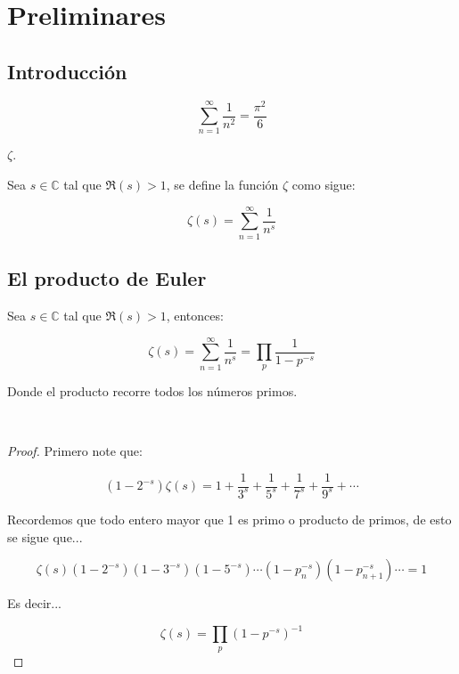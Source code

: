 
\thispagestyle{empty}
\vspace{-0.7cm}


\section{Preliminares}

\lipsum[3]

\subsection{Introducción}
\lipsum[1]

$$\sum_{n=1}^{\infty}\dfrac{1}{n^2}=\dfrac{\pi^2}{6}$$

\lipsum[2]$\zeta$.

\begin{definition}
Sea $s \in \mathbb{C}$ tal que $\Re(s)>1$, se define la función $\zeta$ como sigue:

$$\zeta(s)=\sum_{n=1}^{\infty}\dfrac{1}{n^s}$$
\end{definition}

\begin{note}
  \lipsum[1]
\end{note}


\subsection{El producto de Euler}
\lipsum[2]
\begin{theorem}
    Sea $s\in \mathbb{C}$ tal que $\Re(s)>1$, entonces:

    $$\zeta(s)=\sum_{n=1}^{\infty}\dfrac{1}{n^s}=\prod_p \dfrac{1}{1-p^{-s}}$$

    Donde el producto recorre todos los números primos.
\end{theorem}

\lipsum[3]\\

\begin{proof}
    Primero note que:

    $$(1-2^{-s})\zeta(s)=1+\dfrac{1}{3^s}+\dfrac{1}{5^s}+\dfrac{1}{7^s}+\dfrac{1}{9^s}+\cdots$$

    Recordemos que todo entero mayor que 1 es primo o producto de primos, de esto se sigue que...

    $$\zeta(s)\left(1-2^{-s}\right)(1-3^{-s})(1-5^{-s})\cdots(1-p_n^{-s})(1-p_{n+1}^{-s})\cdots=1$$

    Es decir...

    $$\zeta(s)=\prod_p (1-p^{-s})^{-1}$$
\end{proof}

